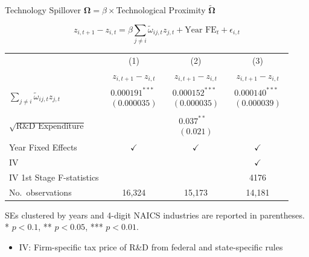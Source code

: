 \documentclass[
  10pt,
  aspectratio=169,   %
  handout           %
]{beamer}
\theoremstyle{plain}
\begin{document}
\begin{frame}{Technology Spillover $\bm{\Omega}=\beta\times$Technological Proximity $\bm{\widetilde{\Omega}}$ \hyperlink{first_stage}{}}
  \label{regression}
  {\footnotesize
  \vspace{-5mm}
  \[
    z_{i,t+1}-z_{i,t}
    =\beta\sum_{j\neq i}\tilde{\omega}_{ij,t}z_{j,t}
    +\text{Year FE}_{t}
    +\epsilon_{i,t}
  \]
  \begin{center}
    \setlength{\tabcolsep}{6pt} %
    \begin{tabular}{lccc}
      \hline\hline
      & (1) & (2) & (3) \\
      & $z_{i,t+1}-z_{i,t}$
      & $z_{i,t+1}-z_{i,t}$
      & $z_{i,t+1}-z_{i,t}$ \\
      \hline
      $\sum_{j\neq i}\tilde{\omega}_{ij,t}z_{j,t}$
      & $\begin{array}{c}\text{0.000191}^{***}\\(\text{0.000035})\end{array}$
      & $\begin{array}{c}\text{0.000152}^{***}\\(\text{0.000035})\end{array}$
      & $\begin{array}{c}\text{0.000140}^{***}\\(\text{0.000039})\end{array}$ \\
      $\sqrt{\text{R\&D Expenditure}}$
      &
      & $\begin{array}{c}\text{0.037}^{**}\\(\text{0.021})\end{array}$
      &  \\
      \hline
      Year Fixed Effects                & $\checkmark$ & $\checkmark$ & $\checkmark$ \\
      IV                                &              &              & $\checkmark$ \\
      IV 1st Stage F-statistics         &              &              & 4176         \\
      No.\ observations                 & 16,324       & 15,173       & 14,181       \\
      \hline\hline
    \end{tabular}
  \end{center}
  SEs clustered by years and 4-digit NAICS industries are reported in parentheses.
  {*} $p<\text{0.1}$, {**} $p<\text{0.05}$, {***} $p<\text{0.01}$.}
  \begin{itemize}
    \item IV: Firm-specific tax price of R\&D from federal and state-specific rules \citep{Bloom2013-pn}
  \end{itemize}
\end{frame}
\end{document}
